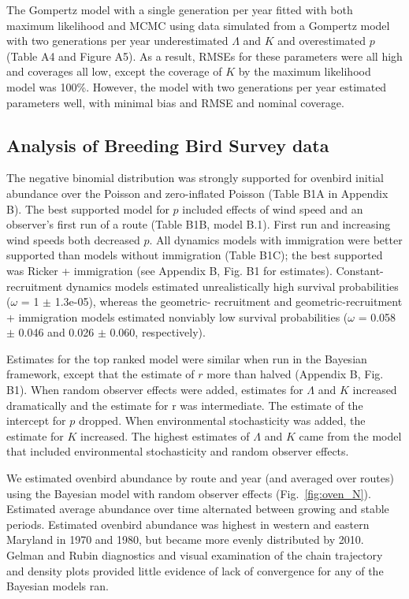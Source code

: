 \documentclass[12pt,english]{article}
\begin{document}
\begin{spacing}{1.9}
\begin{flushleft}
The Gompertz model with a single generation per year fitted with both maximum likelihood and
MCMC using data simulated from a Gompertz model with two generations per year underestimated 
$\Lambda$  and $K$ and 
overestimated $p$ (Table A4 and Figure A5).  As a result, RMSEs for these parameters 
were all high and coverages all low, except the coverage of $K$ by the maximum 
likelihood model was 100\%.  However, the model with two generations per year 
estimated parameters well, with minimal bias and RMSE and nominal coverage.

\subsection*{Analysis of Breeding Bird Survey data}


The negative binomial distribution was strongly supported for ovenbird
initial abundance over the Poisson and zero-inflated Poisson
(Table B1A in Appendix B). 
The best supported model for $p$ included effects of wind speed  
and an observer's first run of a route (Table B1B, model B.1). First run 
and increasing wind speeds both decreased $p$. All dynamics models 
with immigration were better supported than models without immigration 
(Table B1C); the best supported was Ricker + immigration 
(see Appendix B, Fig. B1 for estimates).
Constant-recruitment dynamics models estimated unrealistically high
survival probabilities ($\omega$ = 1 $\pm$ 1.3e-05), whereas 
the geometric- recruitment and geometric-recruitment + immigration
models estimated nonviably low survival probabilities 
($\omega$ =
0.058 $\pm$ 0.046 and 0.026 $\pm$ 0.060, respectively). 

Estimates for the top ranked model 
were similar when
run in the Bayesian framework, except that the estimate of $r$
more than halved (Appendix B, Fig. B1). 
When random observer effects
were added, estimates for $\Lambda$ and $K$ increased dramatically
and the estimate for r was intermediate. The 
estimate of the intercept for $p$ dropped. 
When environmental stochasticity was added, the estimate for $K$ increased. 
The highest estimates of $\Lambda$ and $K$ came 
from the model that included environmental stochasticity and random observer effects. 

We estimated ovenbird abundance by route and year (and averaged over routes) 
using the Bayesian model with random observer effects (Fig.~\ref{fig:oven_N}).  
Estimated average abundance over time alternated between growing and stable periods.  
Estimated ovenbird
abundance was highest in western and eastern Maryland in 1970 and 1980, but became
more evenly distributed by 2010.  Gelman and Rubin diagnostics and visual 
examination of the chain trajectory and density plots
provided little evidence of lack of convergence for any of the Bayesian models ran.  



\end{flushleft}
\end{spacing}
\end{document}
